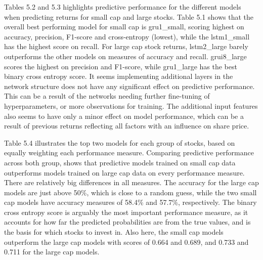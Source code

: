 \indent\newline
Tables 5.2 and 5.3 highlights predictive performance for the different models when predicting returns for small cap and large stocks. Table 5.1 shows that the overall best performing model for small cap is gru1\_small, scoring highest on accuracy, precision, F1-score and cross-entropy (lowest), while the lstm1\_small has the highest score on recall. For large cap stock returns, lstm2\_large barely outperforms the other models on measures of accuracy and recall. grui8\_large scores the highest on precision and F1-score, while gru1\_large has the best binary cross entropy score. It seems implementing additional layers in the network structure does not have any significant effect on predictive performance. This can be a result of the networks needing further fine-tuning of hyperparameters, or more observations for training. The additional input features also seems to have only a minor effect on model performance, which can be a result of previous returns reflecting all factors with an influence on share price.

\indent\newline
\begin{table}[ht]
\centering
{}
\caption{Comparison of top performing models}
\end{table}

\indent\newline
\indent\newline
Table 5.4 illustrates the top two models for each group of stocks, based on equally weighting each performance measure. Comparing predictive performance across both group, shows that predictive models trained on small cap data outperforms models trained on large cap data on every performance measure. There are relatively big differences in all measures. The accuracy for the large cap models are just above 50\%, which is close to a random guess, while the two small cap models have accuracy measures of 58.4\% and 57.7\%, respectively. The binary cross entropy score is arguably the most important performance measure, as it accounts for how far the predicted probabilities are from the true values, and is the basis for which stocks to invest in. Also here, the small cap models outperform the large cap models with scores of 0.664 and 0.689, and 0.733 and 0.711 for the large cap models.     

